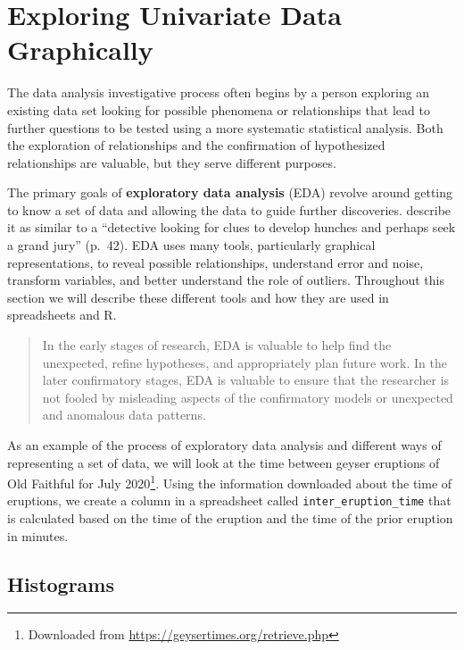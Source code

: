 \documentclass[
]{book}
\theoremstyle{definition}
\theoremstyle{definition}
\theoremstyle{definition}
\theoremstyle{definition}
\theoremstyle{remark}
\begin{document}
\hypertarget{exploring-univariate-data-graphically}{%
\section{Exploring Univariate Data Graphically}\label{exploring-univariate-data-graphically}}

The data analysis investigative process often begins by a person exploring an existing data set looking for possible phenomena or relationships that lead to further questions to be tested using a more systematic statistical analysis. Both the exploration of relationships and the confirmation of hypothesized relationships are valuable, but they serve different purposes.

The primary goals of \textbf{exploratory data analysis} (EDA) revolve around getting to know a set of data and allowing the data to guide further discoveries. \citet{EDA2003} describe it as similar to a ``detective looking for clues to develop hunches and perhaps seek a grand jury'' (p.~42). EDA uses many tools, particularly graphical representations, to reveal possible relationships, understand error and noise, transform variables, and better understand the role of outliers. Throughout this section we will describe these different tools and how they are used in spreadsheets and R.

\begin{quote}
In the early stages of research, EDA is valuable to help find the unexpected, refine hypotheses, and appropriately plan future work. In the later confirmatory stages, EDA is valuable to ensure that the researcher is not fooled by misleading aspects of the confirmatory models or unexpected and anomalous data patterns. \citep[p.~60]{EDA2003}
\end{quote}

As an example of the process of exploratory data analysis and different ways of representing a set of data, we will look at the time between geyser eruptions of Old Faithful for July 2020\footnote{Downloaded from \url{https://geysertimes.org/retrieve.php}}. Using the information downloaded about the time of eruptions, we create a column in a spreadsheet called \texttt{inter\_eruption\_time} that is calculated based on the time of the eruption and the time of the prior eruption in minutes.

\hypertarget{histograms}{%
\subsection{Histograms}\label{histograms}}
\end{document}
